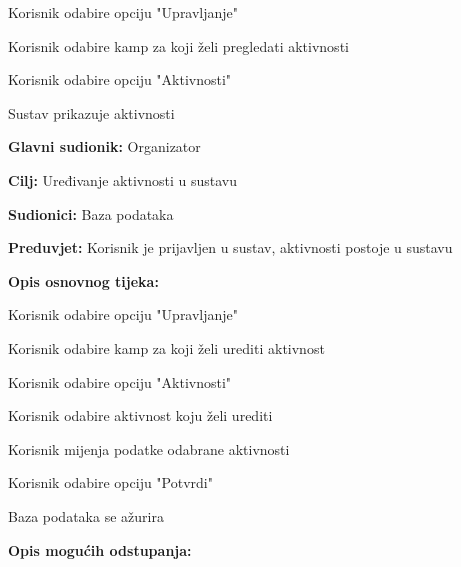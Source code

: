 \begin{packed_item}
\begin{packed_item}
						\item[] \begin{packed_enum}
							
							\item Korisnik odabire opciju "Upravljanje"
							\item Korisnik odabire kamp za koji želi pregledati aktivnosti
							\item Korisnik odabire opciju "Aktivnosti"
							\item Sustav prikazuje aktivnosti
						\end{packed_enum}
						
						
					\end{packed_item}
				
					\noindent {}
					\begin{packed_item}
						
						\item \textbf{Glavni sudionik: }Organizator
						\item  \textbf{Cilj:} Uređivanje aktivnosti u sustavu
						\item  \textbf{Sudionici:} Baza podataka
						\item  \textbf{Preduvjet:} Korisnik je prijavljen u sustav, aktivnosti postoje u sustavu
						\item  \textbf{Opis osnovnog tijeka:}
						
						\item[] \begin{packed_enum}
							
							
							\item Korisnik odabire opciju "Upravljanje"
							\item Korisnik odabire kamp za koji želi urediti aktivnost
							\item Korisnik odabire opciju "Aktivnosti"
							\item Korisnik odabire aktivnost koju želi urediti
							\item Korisnik mijenja podatke odabrane aktivnosti
							\item Korisnik odabire opciju "Potvrdi"
							\item Baza podataka se ažurira
						\end{packed_enum}
						
						\item  \textbf{Opis mogućih odstupanja:}
						
						\item[] \begin{packed_item}
							

\end{packed_item}
\end{packed_item}
\end{packed_item}
